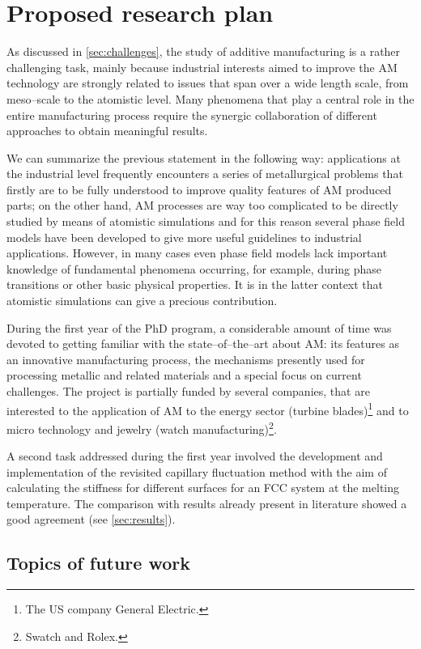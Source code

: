 \chapter{Proposed research plan}
As discussed in \cref{sec:challenges}, the study of additive manufacturing is a rather challenging task, mainly because industrial interests aimed to improve the AM technology are strongly related to issues that span over a wide length scale, from meso--scale to the atomistic level. Many phenomena that play a central role in the entire manufacturing process require the synergic collaboration of different approaches to obtain meaningful results.

We can summarize the previous statement in the following way: applications at the industrial level frequently encounters a series of metallurgical problems that firstly are to be fully understood to improve quality features of AM produced parts; on the other hand, AM processes are way too complicated to be directly studied by means of atomistic simulations and for this reason several phase field models have been developed to give more useful guidelines to industrial applications. However, in many cases even phase field models lack important knowledge of fundamental phenomena occurring, for example, during phase transitions or other basic physical properties. It is in the latter context that atomistic simulations can give a precious contribution. 

During the first year of the PhD program, a considerable amount of time was devoted to getting familiar with the state--of--the--art about AM: its features as an innovative manufacturing process, the mechanisms presently used for processing metallic and related materials and a special focus on current challenges. The project is partially funded by several companies, that are interested to the application of AM to the energy sector (turbine blades)\footnote{The US company General Electric.} and to micro technology and jewelry (watch manufacturing)\footnote{Swatch and Rolex.}.


A second task addressed during the first year involved the development and implementation of the revisited capillary fluctuation method with the aim of calculating the stiffness for different surfaces for an FCC system at the melting temperature. The comparison with results already present in literature showed a good agreement (see \cref{sec:results}).



\section{Topics of future work}

